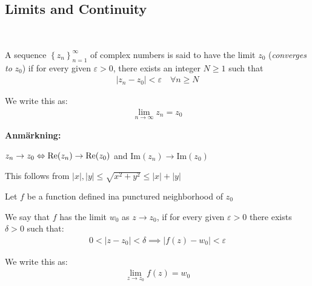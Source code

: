 \subsection{Limits and Continuity}\hfill\\
\par\bigskip
\begin{theo}{}
  A sequence $\left\{z_n\right\}_{n=1}^\infty$ of complex numbers is said to have the limit $z_0$ (\textit{converges to} $z_0$) if for every given $\varepsilon>0$, there exists an integer $N\geq1$  such that
  \begin{equation*}
    \begin{gathered}
      \left|z_n-z_0\right|<\varepsilon\quad \forall n\geq N
    \end{gathered}
  \end{equation*}
  \par\bigskip
  \noindent We write this as:
  \begin{equation*}
    \begin{gathered}
      \lim_{n\to\infty}z_n = z_0
    \end{gathered}
  \end{equation*}
\end{theo}
\par\bigskip
\noindent\textbf{Anmärkning:}\par
\noindent $z_n\to z_0\Leftrightarrow \text{Re}(z_n)\to\text{Re}(z_0)$ and Im$(z_n)\to\text{Im}(z_0)$\par
\noindent This follows from $\left|x\right|, \left|y\right|\leq\sqrt{x^2+y^2}\leq\left|x\right|+\left|y\right|$ 
\par\bigskip
\begin{theo}[]{}
  Let $f$ be a function defined ina  punctured neighborhood of $z_0$
  \par\bigskip
  \noindent We say that $f$ has the limit $w_0$ as $z\to z_0$, if for every given $\varepsilon>0$ there exists $\delta>0$ such that:
  \begin{equation*}
    \begin{gathered}
      0<\left|z-z_0\right|<\delta\implies \left|f(z)-w_0\right|<\varepsilon
    \end{gathered}
  \end{equation*}
  \par\bigskip
  \noindent We write this as:
  \begin{equation*}
    \begin{gathered}
      \lim_{z\to z_0}f(z) = w_0
    \end{gathered}
  \end{equation*}
\end{theo}
